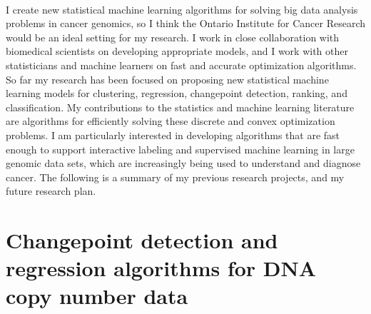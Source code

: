 \documentclass{article}
\begin{document}
\mbox{ }




I create new statistical machine learning algorithms for solving big
data analysis problems in cancer genomics, so I think the Ontario
Institute for Cancer Research would be an ideal setting for my
research. I work in close collaboration with biomedical scientists on
developing appropriate models, and I work with other statisticians and
machine learners on fast and accurate optimization algorithms. So far
my research has been focused on proposing new statistical machine
learning models for clustering, regression, changepoint detection,
ranking, and classification. My contributions to the statistics and
machine learning literature are algorithms for efficiently solving
these discrete and convex optimization problems. I am particularly
interested in developing algorithms that are fast enough to support
interactive labeling and supervised machine learning in large genomic
data sets, which are increasingly being used to understand and
diagnose cancer. The following is a summary of my previous research
projects, and my future research plan.

\section{Changepoint detection and regression algorithms for DNA copy
  number data}
\end{document}

